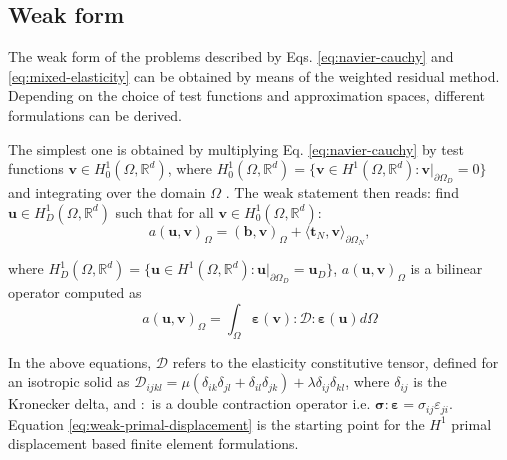\documentclass[english,11pt,3p,number,sort&compress]{elsarticle}
\begin{document}
\subsection{Weak form}

The weak form of the problems described by Eqs. \eqref{eq:navier-cauchy} and \eqref{eq:mixed-elasticity} can be obtained by means of the weighted residual method. Depending on the choice of test functions and approximation spaces, different formulations can be derived.

The simplest one is obtained by multiplying Eq. \eqref{eq:navier-cauchy} by test functions $\bm{v} \in H^1_0(\Omega,\mathbb{R}^d)$, where $H^1_0(\Omega,\mathbb{R}^d)=\{\bm{v} \in H^1(\Omega,\mathbb{R}^d) : \bm{v} \lvert_{\partial\Omega_D}=0 \}$ and integrating over the domain $\Omega$ \cite{becker1981finite}. The weak statement then reads: find $\mathbf{u} \in H^1_D(\Omega,\mathbb{R}^d)$ such that for all $\mathbf{v} \in H^1_0(\Omega,\mathbb{R}^d)$:
\begin{equation} \label{eq:weak-primal-displacement}
    a\left(\bm{u},\bm{v}\right)_\Omega = \left(\bm{b},\bm{v}\right)_\Omega + \langle\bm{t}_N,\bm{v}\rangle_{\partial\Omega_N},
\end{equation}

\noindent where $H^1_D(\Omega,\mathbb{R}^d)=\{\bm{u} \in H^1(\Omega,\mathbb{R}^d) : \bm{u} \lvert_{\partial\Omega_D}=\bm{u}_D\}$, $a\left(\bm{u},\bm{v}\right)_\Omega$ is a bilinear operator computed as
\begin{equation*}
	a\left(\bm{u},\bm{v}\right)_\Omega = \int_{\Omega} \bm{\varepsilon}(\bm{v}) : \mathcal{D} : \bm{\varepsilon}(\bm{u}) d\Omega
\end{equation*}

In the above equations, $\mathcal{D}$ refers to the elasticity constitutive tensor, defined for an isotropic solid as $\mathcal{D}_{ijkl} = \mu(\delta_{ik}\delta_{jl}+\delta_{il}\delta_{jk})+\lambda\delta_{ij}\delta_{kl}$, where $\delta_{ij}$ is the Kronecker delta, and $:$ is a double contraction operator i.e. $\bm{\sigma}:\bm{\varepsilon} = \sigma_{ij}\varepsilon_{ji}$. Equation \eqref{eq:weak-primal-displacement} is the starting point for the $H^1$ primal displacement based finite element formulations.
\end{document}
